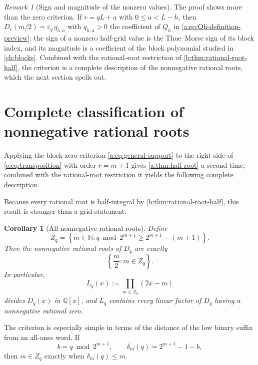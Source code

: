 \documentclass[11pt,a4paper,oneside,openany]{book}
\numberwithin{equation}{chapter}
\newtheorem{corollary}[theorem]{Corollary}
\theoremstyle{definition}
\theoremstyle{remark}
\newtheorem{remark}[theorem]{Remark}
\newcommand{\N}{\mathbb N}
\newcommand{\Q}{\mathbb Q}
\newcommand{\eps}{\varepsilon}
\newcommand{\Diag}{D}
\begin{document}
\begin{remark}[Sign and magnitude of the nonzero values]
The proof shows more than the zero criterion. If $r=qL+a$ with
$0\le a<L-h$, then $\Diag_r(m/2)=\eps_q\,q_{h,a}$ with $q_{h,a}>0$ the
coefficient of $Q_h$ in \eqref{a:eq:Qh-definition-preview}: the sign of a
nonzero half-grid value is the Thue--Morse sign of its block index, and its
magnitude is a coefficient of the block polynomial studied in
\cref{ch:blocks}. Combined with the rational-root restriction of
\cref{b:thm:rational-root-half}, the criterion is a complete description of
the nonnegative rational roots, which the next section spells out.
\end{remark}

\section{Complete classification of nonnegative rational roots}

Applying the block zero criterion \cref{a:eq:general-support} to the right side of \cref{c:eq:transposition} with order \(r=m+1\) gives \cref{a:thm:half-root} a second time; combined with the rational-root restriction it yields the following complete description.

Because every rational root is half-integral by
\cref{b:thm:rational-root-half}, this result is stronger than a grid statement.

\begin{corollary}[All nonnegative rational roots]\label{c:cor:all-nonneg-rational}
Define
\begin{equation}
 Z_q=\left\{m\in\N:
 q\bmod2^{m+1}\geq2^{m+1}-(m+1)\right\}.                  \label{c:eq:Zq}
\end{equation}
Then the nonnegative rational roots of \(\Diag_q\) are exactly
\begin{equation}
 \left\{\frac m2:m\in Z_q\right\}.                        \label{c:eq:nonneg-rational-roots}
\end{equation}
In particular,
\begin{equation}
 L_q(x):=\prod_{m\in Z_q}(2x-m)                            \label{c:eq:Lq}
\end{equation}
divides \(\Diag_q(x)\) in \(\Q[x]\), and \(L_q\) contains every linear
factor of \(\Diag_q\) having a nonnegative rational zero.
\end{corollary}

The criterion is especially simple in terms of the distance of the low
binary suffix from an all-ones word.  If
\[
 b=q\bmod2^{m+1},
 \qquad
 \delta_m(q)=2^{m+1}-1-b,
\]
then \(m\in Z_q\) exactly when \(\delta_m(q)\leq m\).
\end{document}
